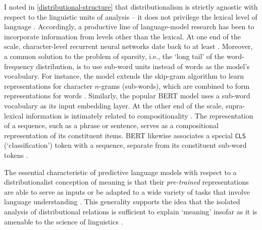 I noted in \cref{distributional-structure} that distributionalism is strictly agnostic
with respect to the linguistic units of analysis -- it does not privilege the lexical
level of language \parencites[190]{Gastaldi2021}.
Accordingly, a productive line of language-model research has been to incorporate
information from levels other than the lexical.
At one end of the scale, character-level recurrent neural networks date back to at
least \textcites{Elman1990}{Schmidhuber1996}.
Moreover, a common solution to the problem of sparsity, i.e., the `long tail' of the
word-frequency distribution, is to use sub-word units instead of words as the model's
vocabulary.
For instance, the \fasttext{} model extends the skip-gram algorithm
\parencites{Mikolov2013} to learn representations for character $n$-grams (sub-words),
which are combined to form representations for words
\parencites[136-137]{Bojanowski2017}.
Similarly, the popular BERT model uses a sub-word vocabulary \parencites{Wu2016} as its
input embedding layer.
At the other end of the scale, supra-lexical information is intimately related to
compositionality .
The representation of a sequence, such as a phrase or sentence, serves as a
compositional representation of its constituent items.
BERT likewise associates a special \texttt{CLS} (`classification') token with a
sequence, separate from its constituent sub-word tokens \parencites[4174]{Devlin2019}.

The essential characteristic of predictive language models with respect to a
distributionalist conception of meaning is that their \emph{pre-trained}
representations are able to serve as inputs or be adapted to a wide variety of tasks
that involve language understanding
\parencites[e.g.][]{Turian2010}{Mikolov2018}[23-24]{Bommasani2022}.
This generality supports the idea that the isolated analysis of distributional
relations is sufficient to explain `meaning' insofar as it is amenable to the science
of linguistics .
